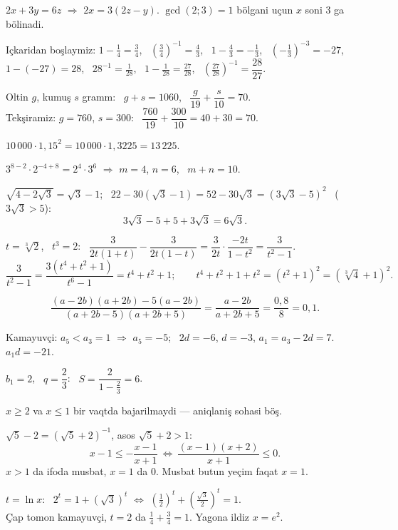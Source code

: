 




$2x+3y=6z$ $\Rightarrow$ $2x=3(2z-y)$. $\gcd(2;3)=1$ bölgani uçun $x$ soni $3$ ga bölinadi.

Içkaridan boşlaymiz: $1-\frac14=\frac34$, \ $\left(\frac34\right)^{-1}=\frac43$, \ $1-\frac43=-\frac13$, \ $\left(-\frac13\right)^{-3}=-27$,\\
$1-(-27)=28$, \ $28^{-1}=\frac1{28}$, \ $1-\frac1{28}=\frac{27}{28}$, \ $\left(\frac{27}{28}\right)^{-1}=\dfrac{28}{27}$.

Oltin $g$, kumuş $s$ gramm: \ $g+s=1060$, \ $\dfrac g{19}+\dfrac s{10}=70$.\\
Tekşiramiz: $g=760$, $s=300$: \ $\dfrac{760}{19}+\dfrac{300}{10}=40+30=70$.

$10\,000\cdot1{,}15^2=10\,000\cdot1{,}3225=13\,225$.

$3^{8-2}\cdot2^{-4+8}=2^4\cdot3^6$ $\Rightarrow$ $m=4$, $n=6$, \ $m+n=10$.

$\sqrt{4-2\sqrt3}=\sqrt3-1$; \ $22-30\left(\sqrt3-1\right)=52-30\sqrt3=\left(3\sqrt3-5\right)^2$ \ ($3\sqrt3>5$):
\[3\sqrt3-5+5+3\sqrt3=6\sqrt3.\]

$t=\sqrt[3]2$, \ $t^3=2$: \ $\dfrac3{2t(1+t)}-\dfrac3{2t(1-t)}=\dfrac3{2t}\cdot\dfrac{-2t}{1-t^2}=\dfrac3{t^2-1}$.
\[\frac3{t^2-1}=\frac{3\left(t^4+t^2+1\right)}{t^6-1}=t^4+t^2+1;\qquad t^4+t^2+1+t^2=\left(t^2+1\right)^2=\left(\sqrt[3]4+1\right)^2.\]

\[\frac{(a-2b)(a+2b)-5(a-2b)}{(a+2b-5)(a+2b+5)}=\frac{a-2b}{a+2b+5}=\frac{0{,}8}{8}=0{,}1.\]

Kamayuvçi: $a_5<a_3=1$ $\Rightarrow$ $a_5=-5$; \ $2d=-6$, $d=-3$, $a_1=a_3-2d=7$. \ $a_1d=-21$.

$b_1=2$, \ $q=\dfrac23$: \ $S=\dfrac2{1-\frac23}=6$.

$x\ge2$ va $x\le1$ bir vaqtda bajarilmaydi — aniqlaniş sohasi böş.

$\sqrt5-2=\left(\sqrt5+2\right)^{-1}$, asos $\sqrt5+2>1$:
\[x-1\le-\frac{x-1}{x+1}\ \Leftrightarrow\ \frac{(x-1)(x+2)}{x+1}\le0.\]
$x>1$ da ifoda musbat, $x=1$ da $0$. Musbat butun yeçim faqat $x=1$.

$t=\ln x$: \ $2^t=1+\left(\sqrt3\right)^t$ $\Leftrightarrow$ $\left(\frac12\right)^t+\left(\frac{\sqrt3}2\right)^t=1$.\\
Çap tomon kamayuvçi, $t=2$ da $\frac14+\frac34=1$. Yagona ildiz $x=e^2$.


